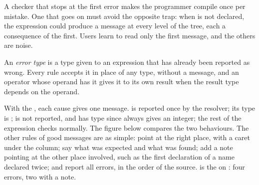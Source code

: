 A checker that stops at the first error makes the programmer compile once per mistake. One that goes on must avoid the opposite trap: when  is not declared, the expression  could produce a message at every level of the tree, each a consequence of the first. Users learn to read only the first message, and the others are noise.

\begin{definition}\label{def:b3:semantic-analysis:error-type}
An \emph{error type} is a type given to an expression that has already been reported as wrong. Every rule accepts it in place of any type, without a message, and an operator whose operand has it gives it to its own result when the result type depends on the operand.
\end{definition}

With the , each cause gives one message.  is reported once by the resolver; its type is ;  is not reported, and has type  since \code{+} always gives an integer; the rest of the expression checks normally. The figure below compares the two behaviours. The other rules of good messages are as simple: point at the right place, with a caret under the column; say what was expected and what was found; add a note pointing at the other place involved, such as the first declaration of a name declared twice; and report all errors, in the order of the source.  is the  on : four errors, two with a note.

\label{lst:b3:semantic-analysis:errors}

\label{out:b3:semantic-analysis:errors}

